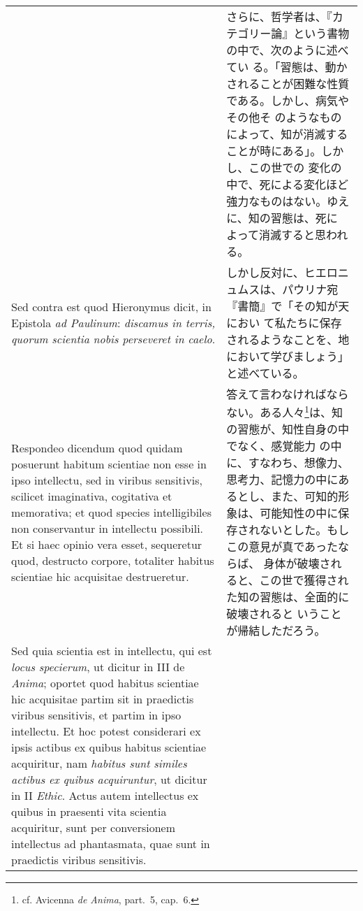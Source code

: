 \documentclass[10pt]{jsarticle} %
\begin{document}
\begin{longtable}{p{21em}p{21em}}
&

さらに、哲学者は、『カテゴリー論』という書物の中で、次のように述べてい
る。「習態は、動かされることが困難な性質である。しかし、病気やその他そ
のようなものによって、知が消滅することが時にある」。しかし、この世での
変化の中で、死による変化ほど強力なものはない。ゆえに、知の習態は、死に
よって消滅すると思われる。

\\


{\sc Sed contra est} quod Hieronymus dicit, in Epistola {\it ad
Paulinum}: {\it discamus in terris, quorum scientia nobis perseveret
in caelo}.

&

しかし反対に、ヒエロニュムスは、パウリナ宛『書簡』で「その知が天におい
て私たちに保存されるようなことを、地において学びましょう」と述べている。

\\


{\sc Respondeo dicendum} quod quidam posuerunt habitum scientiae non
esse in ipso intellectu, sed in viribus sensitivis, scilicet
imaginativa, cogitativa et memorativa; et quod species intelligibiles
non conservantur in intellectu possibili. Et si haec opinio vera
esset, sequeretur quod, destructo corpore, totaliter habitus scientiae
hic acquisitae destrueretur.

&


答えて言わなければならない。ある人々\footnote{cf. Avicenna {\it de
Anima}, part.~5, cap.~6.}は、知の習態が、知性自身の中でなく、感覚能力
の中に、すなわち、想像力、思考力、記憶力の中にあるとし、また、可知的形
象は、可能知性の中に保存されないとした。もしこの意見が真であったならば、
身体が破壊されると、この世で獲得された知の習態は、全面的に破壊されると
いうことが帰結しただろう。


\\



Sed quia scientia est in intellectu, qui est {\it locus specierum}, ut
dicitur in III de {\it Anima}; oportet quod habitus scientiae hic
acquisitae partim sit in praedictis viribus sensitivis, et partim in
ipso intellectu. Et hoc potest considerari ex ipsis actibus ex quibus
habitus scientiae acquiritur, nam {\it habitus sunt similes actibus ex
quibus acquiruntur}, ut dicitur in II {\it Ethic}. Actus autem
intellectus ex quibus in praesenti vita scientia acquiritur, sunt per
conversionem intellectus ad phantasmata, quae sunt in praedictis
viribus sensitivis.


&


\end{longtable}
\end{document}
